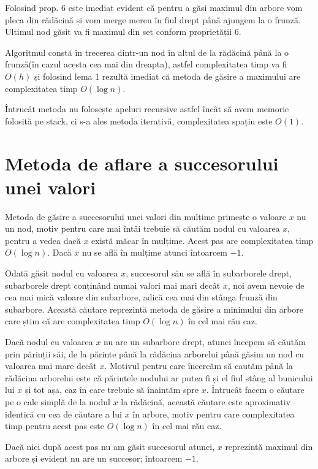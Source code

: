 \documentclass[]{report}
\begin{document}
	Folosind prop. 6 este imediat evident că pentru a găsi maximul din arbore vom
	pleca din rădăcină și vom merge mereu în fiul drept până ajungem la o frunză.
	Ultimul nod găsit va fi maximul din set conform proprietății 6.

	Algoritmul constă în trecerea dintr-un nod în altul de la rădăcină până la o
	frunză(în cazul acesta cea mai din dreapta), astfel complexitatea timp va fi
	$O(h)$ și folosind lema 1 rezultă imediat că metoda de găsire a maximului
	are complexitatea timp $O(\log n)$.

	Întrucât metoda nu folosește apeluri recursive astfel încât să avem memorie
	folosită pe stack, ci s-a ales metoda iterativă, complexitatea spațiu este
	$O(1)$.

	\section*{Metoda de aflare a succesorului unei valori}

	Metoda de găsire a succesorului unei valori din mulțime primește o valoare
	$x$ nu un nod, motiv pentru care mai întâi trebuie să căutăm nodul cu valoarea
	$x$, pentru a vedea dacă $x$ există măcar în mulțime. Acest pas are
	complexitatea timp $O(\log n)$. Dacă $x$ nu se află în mulțime atunci întoarcem
	$-1$.

	Odată găsit nodul cu valoarea $x$, succesorul său se află în subarborele
	drept, subarborele drept conținând numai valori mai mari decât $x$, noi avem
	nevoie de cea mai mică valoare din subarbore, adică cea mai din stânga frunză
	din subarbore. Această căutare reprezintă metoda de găsire a minimului din
	arbore care știm că are complexitatea timp $O(\log n)$ în cel mai rău caz.

	Dacă nodul cu valoarea $x$ nu are un subarbore drept, atunci începem să
	căutăm prin părinții săi, de la părinte până la rădăcina arborelui până
	găsim un nod cu valoarea mai mare decât $x$. Motivul pentru care încercăm
	să cautăm până la rădăcina arborelui este că părintele nodului ar putea fi
	și el fiul stâng al bunicului lui $x$ și tot așa, caz în care trebuie să
	înaintăm spre $x$. Întrucât facem o căutare pe o cale simplă de la nodul $x$
	la rădăcină, această căutare este aproximativ identică cu cea de căutare
	a lui $x$ în arbore, motiv pentru care complexitatea timp pentru acest pas
	este $O(\log n)$ în cel mai rău caz.

	Dacă nici după acest pas nu am găsit succesorul atunci, $x$ reprezintă
	maximul din arbore și evident nu are un succesor; întoarcem $-1$.
\end{document}
